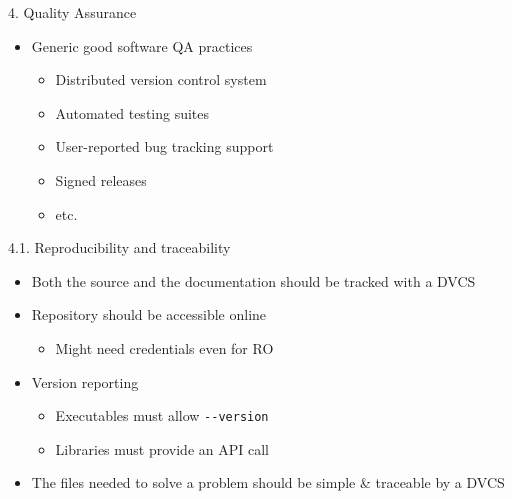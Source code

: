 \documentclass[
  ignorenonframetext,
  aspectratio=169,
]{beamer}
\newcommand{\passthrough}[1]{#1}
\providecommand{\tightlist}{%
  \setlength{\itemsep}{0pt}\setlength{\parskip}{0pt}}
\begin{document}
\begin{frame}[fragile]{}
\protect\hypertarget{section-11}{}
\begin{columns}[T]
\begin{column}{0.5\textwidth}
\begin{block}{4. Quality Assurance}
\protect\hypertarget{quality-assurance}{}
\begin{itemize}
\tightlist
\item
  Generic good software QA practices

  \begin{itemize}
  \tightlist
  \item
    Distributed version control system
  \item
    Automated testing suites
  \item
    User-reported bug tracking support
  \item
    Signed releases
  \item
    etc.
  \end{itemize}
\end{itemize}

\begin{block}{4.1. Reproducibility and traceability}
\protect\hypertarget{reproducibility-and-traceability}{}
\begin{itemize}
\tightlist
\item
  Both the source and the documentation should be tracked with a DVCS
\item
  Repository should be accessible online

  \begin{itemize}
  \tightlist
  \item
    Might need credentials even for RO
  \end{itemize}
\item
  Version reporting

  \begin{itemize}
  \tightlist
  \item
    Executables must allow \passthrough{\lstinline!--version!}
  \item
    Libraries must provide an API call
  \end{itemize}
\item
  The files needed to solve a problem should be simple \& traceable by a
  DVCS
\end{itemize}
\end{block}
\end{block}
\end{column}


\end{columns}
\end{frame}
\end{document}
